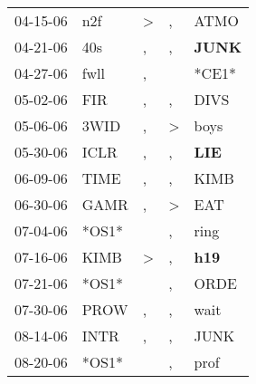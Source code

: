 \begin{supertabular}{p{0.07\textwidth}p{0.06\textwidth}p{0.02\textwidth}p{0.02\textwidth}p{0.06\textwidth}}
          04-15-06\textsuperscript{} &            n2f\textsuperscript{} &     \textgreater &                , &           ATMO\textsuperscript{} \\
          04-21-06\textsuperscript{} &            40s\textsuperscript{} &                , &                , &  \textbf{JUNK\textsuperscript{}} \\
          04-27-06\textsuperscript{} &           fwll\textsuperscript{} &                , &                  &                            *CE1* \\
          05-02-06\textsuperscript{} &            FIR\textsuperscript{} &                , &                , &           DIVS\textsuperscript{} \\
          05-06-06\textsuperscript{} &           3WID\textsuperscript{} &                , &     \textgreater &           boys\textsuperscript{} \\
          05-30-06\textsuperscript{} &           ICLR\textsuperscript{} &                , &                , &   \textbf{LIE\textsuperscript{}} \\
          06-09-06\textsuperscript{} &           TIME\textsuperscript{} &                , &                , &           KIMB\textsuperscript{} \\
          06-30-06\textsuperscript{} &           GAMR\textsuperscript{} &                , &     \textgreater &            EAT\textsuperscript{} \\
          07-04-06\textsuperscript{} &                            *OS1* &                  &                , &           ring\textsuperscript{} \\
          07-16-06\textsuperscript{} &           KIMB\textsuperscript{} &     \textgreater &                , &   \textbf{h19\textsuperscript{}} \\
          07-21-06\textsuperscript{} &                            *OS1* &                  &                , &           ORDE\textsuperscript{} \\
          07-30-06\textsuperscript{} &           PROW\textsuperscript{} &                , &                , &           wait\textsuperscript{} \\
          08-14-06\textsuperscript{} &           INTR\textsuperscript{} &                , &                , &           JUNK\textsuperscript{} \\
          08-20-06\textsuperscript{} &                            *OS1* &                  &                , &           prof\textsuperscript{} \\

\end{supertabular}
